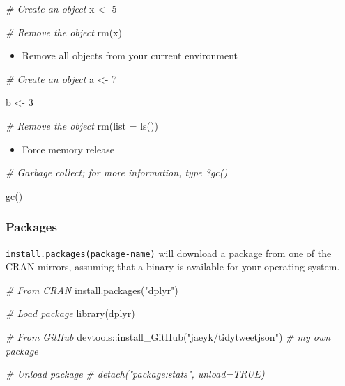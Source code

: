 \documentclass[
]{book}
\newenvironment{Shaded}{\begin{snugshade}}{\end{snugshade}}
\newcommand{\AttributeTok}[1]{\textcolor[rgb]{0.77,0.63,0.00}{#1}}
\newcommand{\CommentTok}[1]{\textcolor[rgb]{0.56,0.35,0.01}{\textit{#1}}}
\newcommand{\DecValTok}[1]{\textcolor[rgb]{0.00,0.00,0.81}{#1}}
\newcommand{\FunctionTok}[1]{\textcolor[rgb]{0.00,0.00,0.00}{#1}}
\newcommand{\NormalTok}[1]{#1}
\newcommand{\OtherTok}[1]{\textcolor[rgb]{0.56,0.35,0.01}{#1}}
\newcommand{\SpecialCharTok}[1]{\textcolor[rgb]{0.00,0.00,0.00}{#1}}
\newcommand{\StringTok}[1]{\textcolor[rgb]{0.31,0.60,0.02}{#1}}
\providecommand{\tightlist}{%
  \setlength{\itemsep}{0pt}\setlength{\parskip}{0pt}}
\begin{document}
\begin{Shaded}
\begin{Highlighting}[]
\CommentTok{\# Create an object }
\NormalTok{x }\OtherTok{\textless{}{-}} \DecValTok{5}

\CommentTok{\# Remove the object }
\FunctionTok{rm}\NormalTok{(x)}
\end{Highlighting}
\end{Shaded}

\begin{itemize}
\tightlist
\item
  Remove all objects from your current environment
\end{itemize}

\begin{Shaded}
\begin{Highlighting}[]
\CommentTok{\# Create an object }
\NormalTok{a }\OtherTok{\textless{}{-}} \DecValTok{7}

\NormalTok{b }\OtherTok{\textless{}{-}} \DecValTok{3}

\CommentTok{\# Remove the object }
\FunctionTok{rm}\NormalTok{(}\AttributeTok{list =} \FunctionTok{ls}\NormalTok{())}
\end{Highlighting}
\end{Shaded}

\begin{itemize}
\tightlist
\item
  Force memory release
\end{itemize}

\begin{Shaded}
\begin{Highlighting}[]
\CommentTok{\# Garbage collect; for more information, type ?gc() }

\FunctionTok{gc}\NormalTok{()}
\end{Highlighting}
\end{Shaded}

\hypertarget{packages}{%
\subsubsection{Packages}\label{packages}}

\texttt{install.packages(package-name)} will download a package from one of the CRAN mirrors, assuming that a binary is available for your operating system.

\begin{Shaded}
\begin{Highlighting}[]
\CommentTok{\# From CRAN}
\FunctionTok{install.packages}\NormalTok{(}\StringTok{"dplyr"}\NormalTok{) }

\CommentTok{\# Load package }
\FunctionTok{library}\NormalTok{(dplyr)}

\CommentTok{\# From GitHub }
\NormalTok{devtools}\SpecialCharTok{::}\FunctionTok{install\_GitHub}\NormalTok{(}\StringTok{"jaeyk/tidytweetjson"}\NormalTok{) }\CommentTok{\# my own package }

\CommentTok{\# Unload package }
\CommentTok{\# detach("package:stats", unload=TRUE)}
\end{Highlighting}
\end{Shaded}
\end{document}
